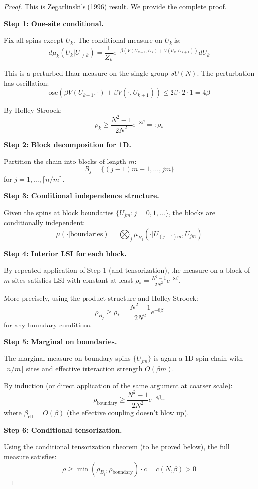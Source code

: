 \begin{proof}
This is Zegarlinski's (1996) result. We provide the complete proof.

\textbf{Step 1: One-site conditional.}

Fix all spins except $U_k$. The conditional measure on $U_k$ is:
\[
d\mu_k(U_k | U_{\neq k}) = \frac{1}{Z_k} e^{-\beta(V(U_{k-1}, U_k) + V(U_k, U_{k+1}))} dU_k
\]

This is a perturbed Haar measure on the single group $SU(N)$. The perturbation has oscillation:
\[
\text{osc}(\beta V(U_{k-1}, \cdot) + \beta V(\cdot, U_{k+1})) \leq 2\beta \cdot 2 \cdot 1 = 4\beta
\]

By Holley-Stroock:
\[
\rho_k \geq \frac{N^2-1}{2N^2} e^{-8\beta} =: \rho_*
\]

\textbf{Step 2: Block decomposition for 1D.}

Partition the chain into blocks of length $m$:
\[
B_j = \{(j-1)m + 1, \ldots, jm\}
\]
for $j = 1, \ldots, \lceil n/m \rceil$.

\textbf{Step 3: Conditional independence structure.}

Given the spins at block boundaries $\{U_{jm} : j = 0, 1, \ldots\}$, the blocks are conditionally independent:
\[
\mu(\cdot | \text{boundaries}) = \bigotimes_j \mu_{B_j}(\cdot | U_{(j-1)m}, U_{jm})
\]

\textbf{Step 4: Interior LSI for each block.}

By repeated application of Step 1 (and tensorization), the measure on a block 
of $m$ sites satisfies LSI with constant at least $\rho_* = \frac{N^2-1}{2N^2}e^{-8\beta}$.

More precisely, using the product structure and Holley-Stroock:
\[
\rho_{B_j} \geq \rho_* = \frac{N^2-1}{2N^2}e^{-8\beta}
\]
for any boundary conditions.

\textbf{Step 5: Marginal on boundaries.}

The marginal measure on boundary spins $\{U_{jm}\}$ is again a 1D spin chain 
with $\lceil n/m \rceil$ sites and effective interaction strength $O(\beta m)$.

By induction (or direct application of the same argument at coarser scale):
\[
\rho_{\text{boundary}} \geq \frac{N^2-1}{2N^2} e^{-8\beta_{\text{eff}}}
\]
where $\beta_{\text{eff}} = O(\beta)$ (the effective coupling doesn't blow up).

\textbf{Step 6: Conditional tensorization.}

Using the conditional tensorization theorem (to be proved below), the full 
measure satisfies:
\[
\rho \geq \min(\rho_{B_j}, \rho_{\text{boundary}}) \cdot c = c(N, \beta) > 0
\]


\end{proof}
